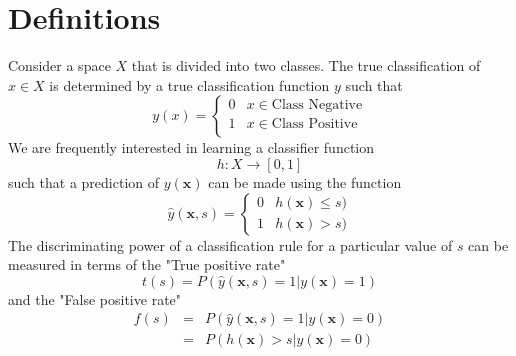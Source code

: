 



\section{Definitions}

Consider a space $X$ that is divided into two classes. The true classification of $x \in X$ is determined by a true classification function $y$ such that
\begin{equation*}
    y(x) = \left\{
    \begin{array}{ll}
    0 & x \in \textrm{Class Negative} \\
    1 & x \in \textrm{Class Positive} \\
    \end{array}
    \right.
\end{equation*}
We are frequently interested in learning a classifier function
\begin{equation*}
    h : X \to [0,1]
\end{equation*}
such that a prediction of $y(\mathbf{x})$ can be made using the function
\begin{equation*}
    \hat{y}(\mathbf{x}, s) = \left\{
        \begin{array}{ll}
            0 & h(\mathbf{x}) \leq s) \\
            1 & h(\mathbf{x}) > s)
        \end{array}
    \right.
\end{equation*}
The discriminating power of a classification rule for a particular value of $s$ can be measured in terms of the "True positive rate"
\begin{equation} \label{def:tpr}
    t(s) = P\left(\hat{y}(\mathbf{x},s) = 1 | y(\mathbf{x})=1 \right)
\end{equation}
and the "False positive rate"
\begin{equation} \label{def:fpr}
    \begin{array}{lcl}
    f(s) & = & P\left(\hat{y}(\mathbf{x},s) = 1 | y(\mathbf{x})=0 \right) \\
         & = & P\left( h(\mathbf{x}) > s | y(\mathbf{x})=0\right) \\
    \end{array}
\end{equation}

